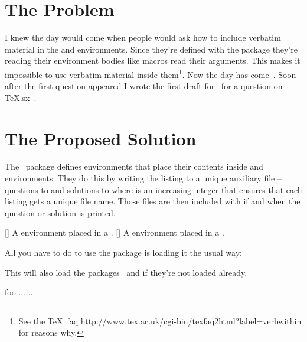 \documentclass[load-preamble+,scrartcl={DIV10}]{cnltx-doc}
\begin{document}
\section{The Problem}
I knew the day would come when people would ask how to include verbatim
material in the  and  environments.  Since they're
defined with the  package they're reading their environment
bodies like macros read their arguments.  This makes it impossible to use
verbatim material inside them\footnote{See the \TeX\ \acs{faq}
  \url{http://www.tex.ac.uk/cgi-bin/texfaq2html?label=verbwithin} for reasons
  why.}.  Now the day has come~\cite{tex.sx:131546}.  Soon after the first
question appeared I wrote the first draft for \ExSheetslistings\ for a question
on \TeX.sx~\cite{tex.sx:133907}.

\section{The Proposed Solution}

The \ExSheetslistings\ package defines  environments that place
their contents inside  and  environments.  They do
this by writing the listing to a unique auxiliary file --
questions to  and solutions to
 where  is an increasing
integer that ensures that each listing gets a unique file name.  Those files
are then included with  if and when the question or
solution is printed.

\begin{environments}
  []
    A  environment placed in a .
  []
    A  environment placed in a .
\end{environments}

All you have to do to use the package is loading it the usual way:
\begin{sourcecode}
  \usepackage{exsheets-listings}
\end{sourcecode}
This will also load the packages \ExSheets\ and  if they're not
loaded already.

\begin{example}
  \begin{lstquestion}[%
      pre=Explain what this piece of \LaTeX\ code does:,
      listings={style=cnltx}]
    \begingroup\expandafter\expandafter\expandafter\endgroup
    \expandafter\ifx\csname foo\endcsname\relax
    ...
    \else
    ...
    \fi
  \end{lstquestion}
\end{example}
\end{document}

